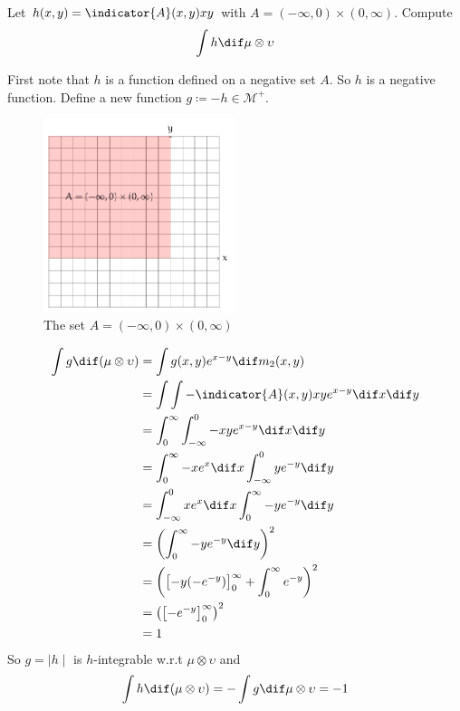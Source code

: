 \begin{problem}
Let \(h(x, y) = \indicator{A}(x, y)xy\) with \(A = (-\infty, 0) \times (0, \infty)\). Compute
\[
	\int h\dif \mu\otimes \upsilon
\]
\end{problem}
\begin{solution}
First note that \(h\) is a function defined on a negative set \(A\). So \(h\) is a negative function. Define a new function \(g\coloneqq-h\in \mathcal{M}^+\).
\begin{figure}[htbp]
	\centering
	\includegraphics[width=0.5\textwidth]{fig/set-reexam-1213-2.pdf}
	\caption{The set \(A = (-\infty, 0) \times (0, \infty)\)}
	\label{fig:exam-1213-2}
\end{figure}
\begin{align*}
    \int g \dif (\mu\otimes\upsilon) & = \int g(x,y)e^{x-y}\dif m_2(x,y) \\
    & =\int \int -\indicator{A}(x,y)xye^{x-y}\dif x\dif y \\
    & = \int_0^\infty \int_{-\infty}^0 -xye^{x-y}\dif x\dif y \\
    & = \int_0^\infty -xe^x \dif x\int_{-\infty}^0 ye^{-y}\dif y \\
    & = \int_{-\infty}^0 xe^x \dif x\int_0^\infty -ye^{-y}\dif y \\
    & = \left(\int_0^\infty -ye^{-y}\dif y\right)^2 \\
    & = \left(\left[-y(-e^{-y})\right]_0^\infty+\int_0^\infty e^{-y}\right)^2 \\
    & = \left( \left[-e^{-y}\right]_0^\infty \right)^2 \\
    & = 1
\end{align*}
So \(g=\mid h\mid\) is \(h\)-integrable w.r.t \(\mu\otimes\upsilon\) and
\[
	\int h\dif (\mu\otimes\upsilon)=-\int g \dif \mu\otimes\upsilon=-1
\]

\end{solution}
